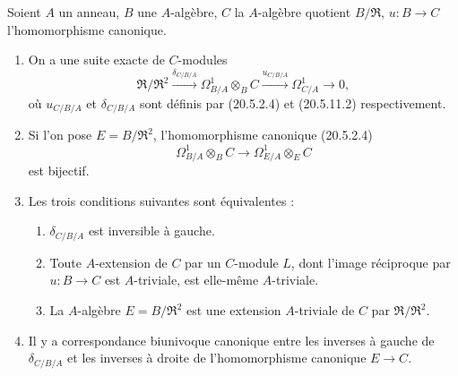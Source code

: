 \begin{theorem}[20.5.12]
\label{0.20.5.12-fr}
Soient $A$ un anneau, $B$ une $A$-algèbre, $C$ la $A$-algèbre quotient
$B/\mathfrak{R}$, $u:B\to C$ l'homomorphisme canonique.
\begin{enumerate}
  \item[\rm(i)] On a une suite exacte de $C$-modules
\begin{equation}
\tag{20.5.12.1}
\label{0.20.5.12.1-fr}
  \mathfrak{R}/\mathfrak{R}^2
  \xrightarrow{\delta_{C/B/A}}\Omega^1_{B/A}\otimes_B C
  \xrightarrow{u_{C/B/A}}\Omega^1_{C/A}\longrightarrow 0,
\end{equation}
où $u_{C/B/A}$ et $\delta_{C/B/A}$ sont définis par (20.5.2.4) et
(20.5.11.2) respectivement.
  \item[\rm(ii)] Si l'on pose $E=B/\mathfrak{R}^2$, l'homomorphisme
canonique (20.5.2.4)
\[
  \Omega^1_{B/A}\otimes_B C\longrightarrow
  \Omega^1_{E/A}\otimes_E C
\]
est bijectif.
  \item[\rm(iii)] Les trois conditions suivantes sont équivalentes :
  \begin{enumerate}
    \item[\rm a)] $\delta_{C/B/A}$ est inversible à gauche.
    \item[\rm b)] Toute $A$-extension de $C$ par un $C$-module $L$, dont
l'image réciproque par $u:B\to C$ est $A$-triviale, est elle-même
$A$-triviale.
    \item[\rm c)] La $A$-algèbre $E=B/\mathfrak{R}^2$ est une extension
$A$-triviale de $C$ par $\mathfrak{R}/\mathfrak{R}^2$.
  \end{enumerate}
  \item[\rm(iv)] Il y a correspondance biunivoque canonique entre les
inverses à gauche de $\delta_{C/B/A}$ et les inverses à droite de
l'homomorphisme canonique $E\to C$.
\end{enumerate}
\end{theorem}

